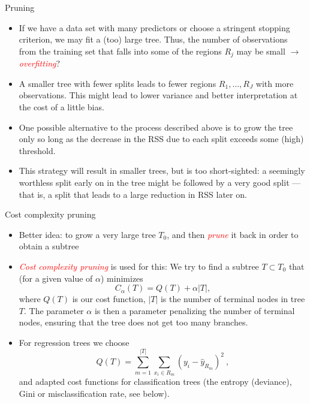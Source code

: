\documentclass[10pt,ignorenonframetext,]{beamer}
\begin{document}
\begin{frame}{Pruning}

\begin{itemize}
\item
  If we have a data set with many predictors or choose a stringent
  stopping criterion, we may fit a (too) large tree. Thus, the number of
  observations from the training set that falls into some of the regions
  \(R_j\) may be small \(\rightarrow\)
  \emph{\textcolor{red}{overfitting}}?
\item
  A smaller tree with fewer splits leads to fewer regions
  \(R_1, \ldots, R_J\) with more observations. This might lead to lower
  variance and better interpretation at the cost of a little bias.
\item
  One possible alternative to the process described above is to grow the
  tree only so long as the decrease in the RSS due to each split exceeds
  some (high) threshold.
\item
  This strategy will result in smaller trees, but is too short-sighted:
  a seemingly worthless split early on in the tree might be followed by
  a very good split --- that is, a split that leads to a large reduction
  in RSS later on.
\end{itemize}

\end{frame}

\begin{frame}

\begin{block}{Cost complexity pruning}

\begin{itemize}
\item
  Better idea: to grow a very large tree \(T_0\), and then
  \emph{\textcolor{red}{prune}} it back in order to obtain a subtree
\item
  \emph{\textcolor{red}{Cost complexity pruning}} is used for this: We
  try to find a subtree \(T\subset T_0\) that (for a given value of
  \(\alpha\)) minimizes \[
  C_{\alpha}(T)=Q(T)+\alpha |T|,
  \] where \(Q(T)\) is our cost function, \(|T|\) is the number of
  terminal nodes in tree \(T\). The parameter \(\alpha\) is then a
  parameter penalizing the number of terminal nodes, ensuring that the
  tree does not get too many branches.
\item
  For regression trees we choose
  \[Q(T)=\sum_{m=1}^{|T|}\sum_{x_i\in R_m}(y_i - \hat{y}_{R_m})^2 \ ,\]
  and adapted cost functions for classification trees (the entropy
  (deviance), Gini or misclassification rate, see below).
\end{itemize}

\end{block}

\end{frame}
\end{document}
